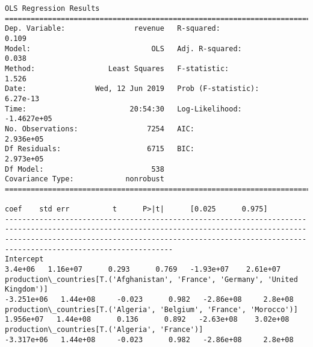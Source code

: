 \documentclass[11pt]{article}
\begin{document}
    \begin{Verbatim}[commandchars=\\\{\}]
                            OLS Regression Results                            
==============================================================================
Dep. Variable:                revenue   R-squared:                       0.109
Model:                            OLS   Adj. R-squared:                  0.038
Method:                 Least Squares   F-statistic:                     1.526
Date:                Wed, 12 Jun 2019   Prob (F-statistic):           6.27e-13
Time:                        20:54:30   Log-Likelihood:            -1.4627e+05
No. Observations:                7254   AIC:                         2.936e+05
Df Residuals:                    6715   BIC:                         2.973e+05
Df Model:                         538                                         
Covariance Type:            nonrobust                                         
=========================================================================================================================================================================================================================================================
                                                                                                                                                                                            coef    std err          t      P>|t|      [0.025      0.975]
---------------------------------------------------------------------------------------------------------------------------------------------------------------------------------------------------------------------------------------------------------
Intercept                                                                                                                                                                                3.4e+06   1.16e+07      0.293      0.769   -1.93e+07    2.61e+07
production\_countries[T.('Afghanistan', 'France', 'Germany', 'United Kingdom')]                                                                                                        -3.251e+06   1.44e+08     -0.023      0.982   -2.86e+08     2.8e+08
production\_countries[T.('Algeria', 'Belgium', 'France', 'Morocco')]                                                                                                                    1.956e+07   1.44e+08      0.136      0.892   -2.63e+08    3.02e+08
production\_countries[T.('Algeria', 'France')]                                                                                                                                         -3.317e+06   1.44e+08     -0.023      0.982   -2.86e+08     2.8e+08

\end{Verbatim}
\end{document}
